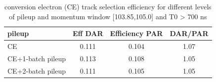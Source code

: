 
\begin{table}[h!]
  \label{table:ce_trq_efficiency_vs_pileup_2} 
  \begin{center}
    \begin{tabular}{l|c|c|c} %
      \textbf{pileup}    & Eff DAR &  Efficiency PAR  &  DAR/PAR   \\
      \hline                                                           
      CE                 &  0.111  &   0.104          &  1.07      \\
      CE+1-batch pileup  &  0.113  &   0.108          &  1.05      \\
      CE+2-batch pileup  &  0.111  &   0.105          &  1.05      \\
    \end{tabular}
  \end{center}
  \caption{
    conversion electron (CE) track selection efficiency for different levels of pileup and momentum window [103.85,105.0] 
    and T0 > 700 ns
  }
\end{table}





